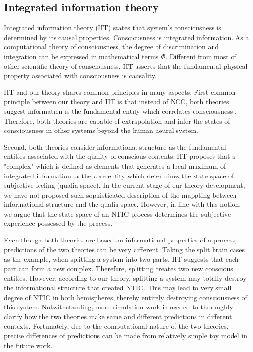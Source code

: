 \documentclass[utf8]{article}
\begin{document}
	
        
		\subsection{Integrated information theory}
    		Integrated information theory (IIT) states that system's consciousness is determined by its causal properties. Consciousness is integrated information. As a computational theory of consciousness, the degree of discrimination and integration can be expressed in mathematical terms $\Phi$. Different from most of other scientific theory of consciousness, IIT asserts that the fundamental physical property associated with consciousness is causality.
    		
    		IIT and our theory shares common principles in many aspects. First common principle between our theory and IIT is that instead of NCC, both theories suggest information is the fundamental entity which correlates consciousness . Therefore, both theories are capable of extrapolation and infer the states of consciousness in other systems beyond the human neural system.
    		
    		Second, both theories consider informational structure as the fundamental entities associated with the quality of conscious contents. IIT proposes that a "complex" which is defined as elements that generates a local maximum of integrated information as the core entity which determines the state space of subjective feeling (qualia space). In the current stage of our theory development, we have not proposed such sophisticated description of the mappting between informational structure and the qualia space. However, in line with this notion, we argue that the state space of an NTIC process determines the subjective experience possessed by the process. 
    		
    		
    		
    
    		Even though both theories are based on informational properties of a process, predictions of the two theories can be very different. Taking the split brain cases as the example, when splitting a system into two parts, IIT suggests that each part can form a new complex. Therefore, splitting creates two new conscious entities. However, according to our theory, splitting a system may totally destroy the informational structure that created NTIC. This may lead to very small degree of NTIC in both hemispheres, thereby entirely destroying consciousness of this system. Notwithstanding, more simulation work is needed to thoroughly clarify how the two theories make same and different predictions in different contexts. Fortunately, due to the computational nature of the two theories, precise differences of predictions can be made from relatively simple toy model in the future work. 
    		
\end{document}
